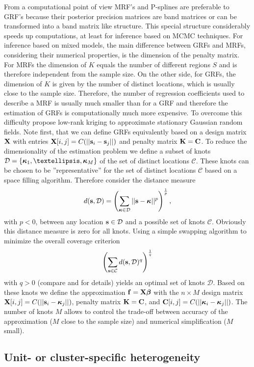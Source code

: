 \documentclass[11pt,a4paper,twoside]{bayesxarticle}
\begin{document}
From a computational point of view MRF's and P-splines are preferable to GRF's because their posterior precision matrices are
band matrices or can be transformed into a band matrix like structure. This special structure considerably speeds up
computations, at least for inference based on MCMC techniques. For inference based on mixed models, the main difference between
GRFs and MRFs, considering their numerical properties, is the dimension of the penalty matrix. For MRFs the dimension of $K$
equals the number of different regions $S$ and is therefore independent from the sample size. On the other side, for GRFs, the
dimension of $K$ is given by the number of distinct locations, which is usually close to the sample size. Therefore, the number
of regression coefficients used to describe a MRF is usually much smaller than for a GRF and therefore the estimation of GRFs
is computationally much more expensive. To overcome this difficulty  propose low-rank kriging to
approximate stationary Gaussian random fields. Note first, that we can define GRFs equivalently based on a design matrix
$\mathbf{X}$ with entries $\mathbf{X}[i,j]=C(||\mathbf{s}_i-\mathbf{s}_j||)$ and penalty matrix $\mathbf{K}=\mathbf{C}$. To reduce the dimensionality of the
estimation problem we define a subset of knots $\mathcal{D}=\{\kappavec_1,\ldots,\kappavec_M\}$ of the set of distinct
locations $\mathcal{C}$. These knots can be chosen to be ''representative'' for the set of distinct locations $\mathcal{C}$
based on a space filling algorithm. Therefore consider the distance measure
\[d(\mathbf{s},\mathcal{D})=\left(\sum_{\boldsymbol{\kappa}\in\mathcal{D}}||\mathbf{s}-\boldsymbol{\kappa}||^p\right)^{\frac{1}{p}},\]
with $p<0$, between any location $\mathbf{s}\in\mathcal{D}$ and a
possible set of knots $\mathcal{C}$. Obviously this distance measure
is zero for all knots. Using a simple swapping algorithm to minimize
the overall coverage criterion
\[\left(\sum_{\mathbf{s}\in\mathcal{C}}d(\mathbf{s},\mathcal{D})^q\right)^{\frac{1}{q}}\]
with $q>0$ (compare  and  for details) yields an optimal set of knots
$\mathcal{D}$. Based on these knots we define the approximation $\mathbf{f}=\mathbf{X}\boldsymbol{\beta}$ with the $n\times M$ design matrix
$\mathbf{X}[i,j]=C(||\mathbf{s}_i-\boldsymbol{\kappa}_j||)$, penalty matrix $\mathbf{K}=\mathbf{C}$, and $\mathbf{C}[i,j]=C(||\boldsymbol{\kappa}_i-\boldsymbol{\kappa}_j||)$. The
number of knots $M$ allows to control the trade-off between accuracy of the approximation ($M$ close to the sample size) and
numerical simplification ($M$ small).

\subsection{Unit- or cluster-specific heterogeneity}
\label{random}
\end{document}
